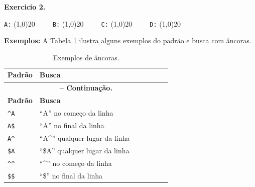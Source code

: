 \begin{refsection}
\begin{blackBlock}{\textbf{Exercicio 2.}}
\begin{center}
\texttt{A:} \line(1,0){20}~~~~~\texttt{B:} \line(1,0){20}~~~~~\texttt{C:} \line(1,0){20}~~~~~\texttt{D:} \line(1,0){20} \\
\end{center}

\end{blackBlock}

\vspace{15pt}

\textbf{Exemplos:} A Tabela \ref{tut2:table:anchor} ilustra alguns exemplos do padrão e busca com âncoras.

\pagestyle{fancy}
\begin{center}

\begin{longtable}{lllllll}
\caption[Tabela \ref{tut2:table:anchor}: Exemplos de âncoras]{Exemplos de âncoras.} \label{tut2:table:anchor} \\


\hline\hline \textbf{Padrão} & \textbf{Busca}\\
\endfirsthead

\multicolumn{6}{c}{{\bfseries \tablename\ \thetable{} -- Continuação.}}\\
\hline\hline \textbf{Padrão} & \textbf{Busca}\\
\endhead
\hline \hline
\endlastfoot
\texttt{\^{}A} & ``A'' no começo da linha\\
\texttt{A\$} & ``A'' no final da linha\\
\texttt{A\^{}} & ``A\^{}'' qualquer lugar da linha\\
\texttt{\$A} & ``\$A'' qualquer lugar da linha\\
\texttt{\^{}\^{}} & ``\^{}'' no começo da linha\\
\texttt{\$\$} & ``\$'' no final da linha\\

\end{longtable}
\end{center}



\end{refsection}
